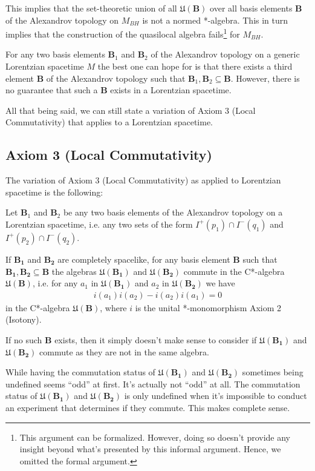 This implies that the set-theoretic union of all $\mathfrak{U}(\mathbf{B})$ over all basis elements $\mathbf{B}$ of the Alexandrov topology on $M_{BH}$ is not a normed *-algebra. This in turn implies that the construction of the quasilocal algebra fails\footnote{This argument can be formalized. However, doing so doesn't provide any insight beyond what's presented by this informal argument. Hence, we omitted the formal argument.} for $M_{BH}$.

For any two basis elements $\mathbf{B}_1$ and $\mathbf{B}_2$ of the Alexandrov topology on a generic Lorentzian spacetime $M$ the best one can hope for is that there exists a third element $\mathbf{B}$ of the Alexandrov topology such that $\mathbf{B}_1, \mathbf{B}_2 \subseteq \mathbf{B}$. However, there is no guarantee that such a $\mathbf{B}$ exists in a Lorentzian spacetime.

All that being said, we can still state a variation of Axiom 3 (Local Commutativity) that applies to a Lorentzian spacetime.

\subsection{Axiom 3 (Local Commutativity)}
The variation of Axiom 3 (Local Commutativity) as applied to Lorentzian spacetime is the following:

\begin{axiom}
    Let $\mathbf{B}_1$ and $\mathbf{B}_2$ be any two basis elements of the Alexandrov topology on a Lorentzian spacetime, i.e. any two sets of the form $I^+(p_1) \cap I^-(q_1)$ and $I^+(p_2) \cap I^-(q_2)$.
    
    If $\mathbf{B_1}$ and $\mathbf{B_2}$ are completely spacelike, for any basis element $\mathbf{B}$ such that $\mathbf{B_1}, \mathbf{B_2} \subseteq \mathbf{B}$ the algebras $\mathfrak{U}(\mathbf{B_1})$ and $\mathfrak{U}(\mathbf{B_2})$ commute in the C*-algebra $\mathfrak{U}(\mathbf{B})$, i.e. for any $a_1$ in $\mathfrak{U}(\mathbf{B_1})$ and $a_2$ in $\mathfrak{U}(\mathbf{B_2})$ we have
    \begin{align}
        i(a_1) i(a_2) - i(a_2) i(a_1) = 0
    \end{align}
    in the C*-algebra $\mathfrak{U}(\mathbf{B})$, where $i$ is the unital *-monomorphism Axiom 2 (Isotony).
    
    If no such $\mathbf{B}$ exists, then it simply doesn't make sense to consider if $\mathfrak{U}(\mathbf{B_1})$ and $\mathfrak{U}(\mathbf{B_2})$ commute as they are not in the same algebra.
\end{axiom}

While having the commutation status of $\mathfrak{U}(\mathbf{B_1})$ and $\mathfrak{U}(\mathbf{B_2})$ sometimes being undefined seems ``odd'' at first. It's actually not ``odd'' at all. The commutation status of $\mathfrak{U}(\mathbf{B_1})$ and $\mathfrak{U}(\mathbf{B_2})$ is only undefined when it's impossible to conduct an experiment that determines if they commute. This makes complete sense.
